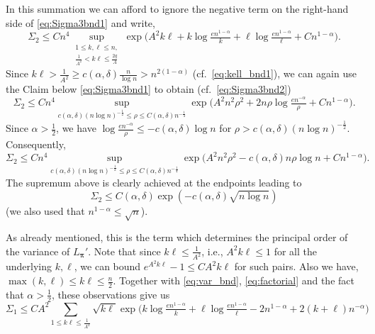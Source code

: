 \documentclass[11pt,reqno,letterpaper]{amsart}
\numberwithin{equation}{section}
\theoremstyle{plain}
\def \bpi{\boldsymbol{\pi}}
\begin{document}
\medskip

 In this summation we can afford to ignore the 
negative term on the right-hand side of \eqref{eq:Sigma3bnd1} and write,
\begin{equation*}%
 \Sigma_2 \le C n^4 \sup_{\substack{1 \le k, \ell \le n,\\ \frac 1{A^2} < k\ell \le \frac{2q}A}}\exp\big(A^2k\ell + k\log \tfrac{en^{1 - \alpha}}{k}  + \ell\log \tfrac{en^{1 - \alpha}}{\ell} + C n^{1 - \alpha}\big).
\end{equation*}
Since $k\ell > \frac 1{A^2} \ge c(\alpha, \delta) \frac n{\log n} > n^{2(1 - \alpha)}$ (cf.~\eqref{eq:kell_bnd1}), we can again use the Claim below 
\eqref{eq:Sigma3bnd1} to obtain (cf.~\eqref{eq:Sigma3bnd2}) 
\begin{equation*}%
\Sigma_2 \le C n^4 \sup_{c(\alpha, \delta)(n\log n)^{-\frac12} \le \rho \le C(\alpha, \delta) n^{-\frac14}} \exp\big(A^2n^2 
\rho^2 + 2n \rho \log \tfrac{en^{-\alpha}}{\rho} + C n^{1 - \alpha}\big).
\end{equation*}
Since $\alpha > \frac12$, we have $\log \tfrac{en^{-\alpha}}{\rho} \le -c(\alpha, \delta) \log n$ for $\rho > c(\alpha, \delta)(n\log n)^{-\frac12}$. Consequently, 
\begin{equation*}%
\Sigma_2 \le C n^4 \sup_{c(\alpha, \delta)(n\log n)^{-\frac12} \le \rho \le C(\alpha, \delta) n^{-\frac14}} \exp\big(A^2n^2 
\rho^2 - c(\alpha, \delta)n \rho \log n + C n^{1 - \alpha}\big).
\end{equation*}
The supremum above is clearly achieved at the endpoints leading to
\begin{equation}\label{eq:Sigma2bnd4}
\Sigma_2 \le C(\alpha, \delta) \exp(-c(\alpha, \delta)\sqrt{n\log n})
\end{equation}
(we also used that $n^{1 - \alpha} \le \sqrt{n}$).

\medskip

 As already mentioned, this is the term which 
determines the principal order of the variance of $L_{\bpi}'$. Note that since $k\ell \le \frac 1{A^2}$, i.e., $A^2k\ell \le 1$ for all the underlying $k, \ell$, 
we can bound $e^{A^2k\ell} - 1 \le C A^2k\ell$ for such pairs. Also we have, $\max(k, \ell) \le k \ell \le \frac n2$. Together with \eqref{eq:var_bnd}, \eqref{eq:factorial} and the fact that $\alpha > \frac 
12$, these observations give us
\begin{equation}\label{eq:Sigma1bnd1}
 \Sigma_1 \le C A^2\sum_{1 \le k\ell \le \frac1{A^2}}\sqrt{k\ell}\exp\big(k\log \tfrac{en^{1 - \alpha}}{k}  + \ell\log \tfrac{en^{1 - \alpha}}{\ell} - 2n^{1 - \alpha} + 2(k + \ell)n^{-\alpha}\big)
\end{equation}
\end{document}
